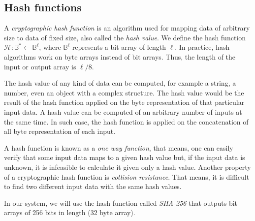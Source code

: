 \clearpage
\subsection{Hash functions} \label{app: hash functions}
A \textit{cryptographic hash function} is an algorithm used for mapping data of arbitrary size to data of fixed size, also called the \textit{hash value}. We define the hash function $\mathcal{H} : \mathbb{B}^* \gets \mathbb{B}^\ell$, where $\mathbb{B}^\ell$ represents a bit array of length $\ell$. In practice, hash algorithms work on byte arrays instead of bit arrays. Thus, the length of the input or output array is $\ell/8$.

The hash value of any kind of data can be computed, for example a string, a number, even an object with a complex structure. The hash value would be the result of the hash function applied on the byte representation of that particular input data. A hash value can be computed of an arbitrary number of inputs at the same time. In such case, the hash function is applied on the concatenation of all byte representation of each input.

A hash function is known as a \textit{one way function}, that means, one can easily verify that some input data maps to a given hash value but, if the input data is unknown, it is infeasible to calculate it given only a hash value. Another property of a cryptographic hash function is \textit{collision resistance}. That means, it is difficult to find two different input data with the same hash values.

In our system, we will use the hash function called \textit{SHA-256} that outputs bit arrays of 256 bits in length (32 byte array).
